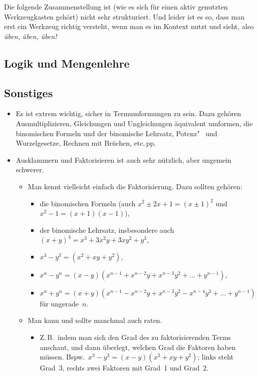\documentclass[a4paper]{article}
\begin{document}
Die folgende Zusammenstellung ist (wie es sich für einen aktiv genutzten Werkzeugkasten gehört) nicht sehr strukturiert. Und leider ist es so, dass man erst ein Werkzeug richtig versteht, wenn man es im Kontext nutzt und sieht, also \emph{üben, üben, üben!}

\subsection{Logik und Mengenlehre}

\subsection{Sonstiges}

\begin{itemize}
    \item Es ist extrem wichtig, sicher in Termumformungen zu sein. Dazu gehören Ausmultiplizieren, Gleichungen und Ungleichungen äquivalent umformen, die binomischen Formeln und der binomische Lehrsatz, Potenz"~ und Wurzelgesetze, Rechnen mit Brüchen, etc.\,pp.
    \item Ausklammern und Faktorisieren ist auch sehr nützlich, aber ungemein schwerer.
          \begin{itemize}
              \item Man kennt vielleicht einfach die Faktorisierung. Dazu sollten gehören:
                    \begin{itemize}
                        \item die binomischen Formeln (auch $x^2 \pm 2x + 1 = (x \pm 1)^2$ und $x^2 - 1 = (x+1)(x-1)$),
                        \item der binomische Lehrsatz, insbesondere auch $(x + y)^3 = x^3 + 3x^2y + 3xy^2 + y^3$,
                        \item $x^3 - y^3 = (x^2 + xy + y^2)$,
                        \item $x^n - y^n = (x-y) (x^{n-1} + x^{n-2}y + x^{n-3}y^2 + \dots + y^{n-1})$,
                        \item $x^n + y^n = (x+y) (x^{n-1} - x^{n-2}y + x^{n-3}y^2 - x^{n-4}y^3 + \dots + y^{n-1})$ für ungerade~$n$.
                    \end{itemize}
              \item Man kann und sollte manchmal auch raten.
                    \begin{itemize}
                        \item Z.\,B.\ indem man sich den Grad des zu faktorisierenden Terms anschaut, und dann überlegt, welchen Grad die Faktoren haben müssen. Bspw.\ $x^3 - y^3 = (x - y) (x^2 + xy + y^2)$; links steht Grad~3, rechts zwei Faktoren mit Grad~1 und Grad~2.

\end{itemize}
\end{itemize}
\end{itemize}
\end{document}
